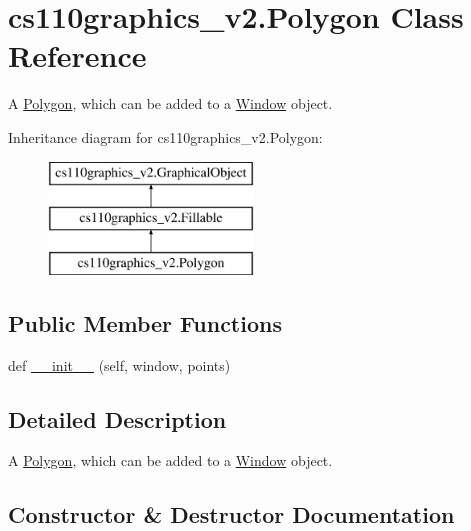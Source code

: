 \hypertarget{classcs110graphics__v2_1_1Polygon}{}\section{cs110graphics\+\_\+v2.\+Polygon Class Reference}
\label{classcs110graphics__v2_1_1Polygon}


A \mbox{\hyperlink{classcs110graphics__v2_1_1Polygon}{Polygon}}, which can be added to a \mbox{\hyperlink{classcs110graphics__v2_1_1Window}{Window}} object.  


Inheritance diagram for cs110graphics\+\_\+v2.\+Polygon\+:\begin{figure}[H]
\begin{center}
\leavevmode
\includegraphics[height=3.000000cm]{classcs110graphics__v2_1_1Polygon}
\end{center}
\end{figure}
\subsection*{Public Member Functions}
\begin{DoxyCompactItemize}
\item 
def \mbox{\hyperlink{classcs110graphics__v2_1_1Polygon_adc176dc409a4c5d17b71dc92c9ba4359}{\+\_\+\+\_\+init\+\_\+\+\_\+}} (self, window, points)
\end{DoxyCompactItemize}


\subsection{Detailed Description}
A \mbox{\hyperlink{classcs110graphics__v2_1_1Polygon}{Polygon}}, which can be added to a \mbox{\hyperlink{classcs110graphics__v2_1_1Window}{Window}} object. 



\subsection{Constructor \& Destructor Documentation}
\mbox{\label{classcs110graphics__v2_1_1Polygon_adc176dc409a4c5d17b71dc92c9ba4359}} 
